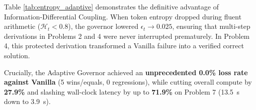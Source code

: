 \documentclass[10pt,twocolumn]{article}
\begin{document}
\begin{table}[t]
\centering
\small
\caption{Proper Entropy-Adaptive Consensus Governor ($\epsilon_t(\mathcal{H}_t)$) Head-to-Head Trace on \texttt{DeepSeek-R1-Distill-Qwen-7B} (NVIDIA A100 GPU).}
\label{tab:entropy_adaptive}
\end{table}

Table \ref{tab:entropy_adaptive} demonstrates the definitive advantage of Information-Differential Coupling. When token entropy dropped during fluent arithmetic ($\mathcal{H}_t < 0.8$), the governor lowered $\epsilon_t \to 0.025$, ensuring that multi-step derivations in Problems 2 and 4 were never interrupted prematurely. In Problem 4, this protected derivation transformed a Vanilla failure into a verified correct solution. 

Crucially, the Adaptive Governor achieved an \textbf{unprecedented 0.0\% loss rate against Vanilla} (5 wins/equals, 0 regressions), while cutting overall compute by \textbf{27.9\%} and slashing wall-clock latency by up to \textbf{71.9\%} on Problem 7 (13.5~s down to 3.9~s).
\end{document}
